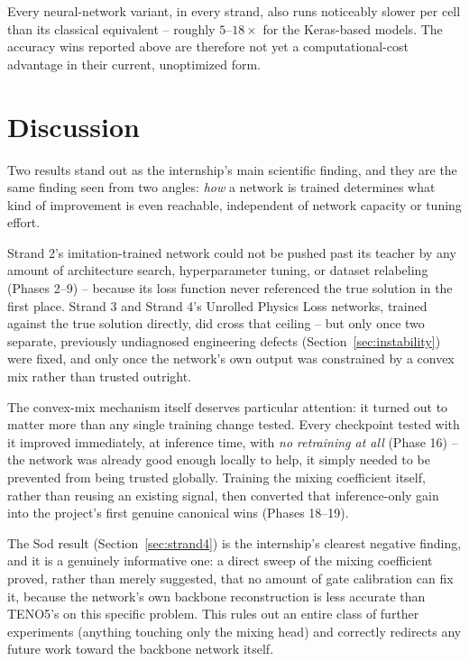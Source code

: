 \documentclass[11pt]{article}
\begin{document}
Every neural-network variant, in every strand, also runs noticeably slower
per cell than its classical equivalent -- roughly $5$--$18\times$ for the
Keras-based models. The accuracy wins reported above are therefore not
yet a computational-cost advantage in their current, unoptimized form.

\section{Discussion}

Two results stand out as the internship's main scientific finding, and
they are the same finding seen from two angles: \emph{how} a network is
trained determines what kind of improvement is even reachable, independent
of network capacity or tuning effort.

Strand 2's imitation-trained network could not be pushed past its teacher
by any amount of architecture search, hyperparameter tuning, or dataset
relabeling (Phases 2--9) -- because its loss function never referenced the
true solution in the first place. Strand 3 and Strand 4's Unrolled Physics
Loss networks, trained against the true solution directly, did cross that
ceiling -- but only once two separate, previously undiagnosed engineering
defects (Section~\ref{sec:instability}) were fixed, and only once the
network's own output was constrained by a convex mix rather than trusted
outright.

The convex-mix mechanism itself deserves particular attention: it turned
out to matter more than any single training change tested. Every
checkpoint tested with it improved immediately, at inference time, with
\emph{no retraining at all} (Phase 16) -- the network was already good
enough locally to help, it simply needed to be prevented from being
trusted globally. Training the mixing coefficient itself, rather than
reusing an existing signal, then converted that inference-only gain into
the project's first genuine canonical wins (Phases 18--19).

The Sod result (Section~\ref{sec:strand4}) is the internship's clearest
negative finding, and it is a genuinely informative one: a direct sweep of
the mixing coefficient proved, rather than merely suggested, that no
amount of gate calibration can fix it, because the network's own backbone
reconstruction is less accurate than TENO5's on this specific problem. This
rules out an entire class of further experiments (anything touching only
the mixing head) and correctly redirects any future work toward the
backbone network itself.
\end{document}
